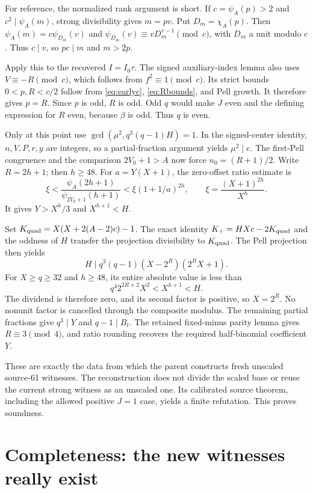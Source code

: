 \documentclass[11pt]{article}
\theoremstyle{remark}\newtheorem{remark}[theorem]{Remark}
\begin{document}
For reference, the normalized rank argument is short. If
$c=\psi_A(p)>2$ and $c^2\mid\psi_A(m)$, strong divisibility gives
$m=pv$. Put $D_m=\chi_A(p)$. Then
$\psi_A(m)=c\psi_{D_m}(v)$ and
$\psi_{D_m}(v)\equiv vD_m^{v-1}\pmod c$, with $D_m$ a unit modulo $c$.
Thus $c\mid v$, so $pc\mid m$ and $m>2p$.

Apply this to the recovered $I=I_0\tau$. The signed auxiliary-index
lemma also uses $V\equiv-R\pmod c$, which follows from $f^2\equiv1\pmod c$.
Its strict bounds $0<p,R<c/2$ follow from \eqref{eq:earlyc},
\eqref{eq:Rbounds}, and Pell growth. It therefore gives $p=R$.
Since $p$ is odd, $R$ is odd. Odd $q$ would make $J$ even and the defining
expression for $R$ even, because $\beta$ is odd. Thus $q$ is even.

Only at this point use
$\gcd(\mu^2,q^3(q-1)H)=1$. In the signed-center identity,
$n,V,P,r,y$ are integers, so a partial-fraction argument yields
$\mu^2\mid e$. The first-Pell congruence and the comparison
$2V_0+1>A$ now force $n_0=(R+1)/2$. Write $R=2h+1$; then $h\ge48$.
For $a=Y(X+1)$, the zero-offset ratio estimate is
\[
\xi<\frac{\psi_A(2h+1)}{\psi_{2V_0+1}(h+1)}
<\xi(1+1/a)^{2h},\qquad
\xi=\frac{(X+1)^{2h}}{X^h}.
\]
It gives $Y>X^h/3$ and $X^{h+1}<H$.

Set $K_{\rm quad}=X(X+2(A-2)c)-1$. The exact identity
$K_+=HXc-2K_{\rm quad}$ and the oddness of $H$ transfer the projection
divisibility to $K_{\rm quad}$. The Pell projection then yields
\[
H\mid q^3(q-1)(X-2^R)(2^RX+1).
\]
For $X\ge q\ge32$ and $h\ge48$, its entire absolute value is less than
\[
q^4 2^{2R+2}X^2<X^{h+1}<H.
\]
The dividend is therefore zero, and its second factor is positive, so
$X=2^R$. No nonunit factor is cancelled through the composite modulus.
The remaining partial fractions give $q^3\mid Y$ and $q-1\mid B_t$.
The retained fixed-minus parity lemma gives $R\equiv3\pmod4$, and ratio
rounding recovers the required half-binomial coefficient $Y$.

These are exactly the data from which the parent constructs fresh unscaled
source-61 witnesses. The reconstruction does not divide the scaled base or
reuse the current strong witness as an unscaled one. Its calibrated source
theorem, including the allowed positive $J=1$ case, yields a finite
refutation. This proves soundness.

\section{Completeness: the new witnesses really exist}
\end{document}
